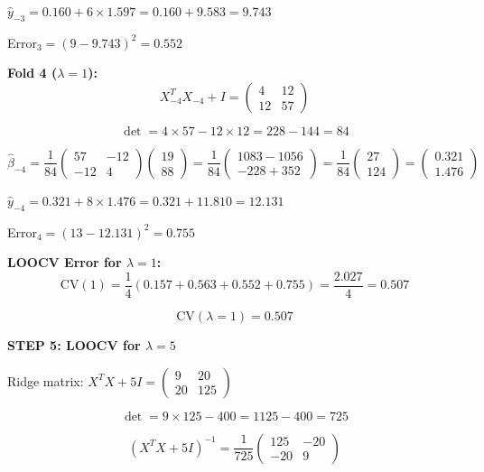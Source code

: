\documentclass[12pt]{article}
\begin{document}
\begin{solution}
$\hat{y}_{-3} = 0.160 + 6 \times 1.597 = 0.160 + 9.583 = 9.743$

Error$_3 = (9 - 9.743)^2 = 0.552$

\textbf{Fold 4 ($\lambda = 1$):}
\[X_{-4}^TX_{-4} + I = \begin{pmatrix} 4 & 12 \\ 12 & 57 \end{pmatrix}\]

\[\det = 4 \times 57 - 12 \times 12 = 228 - 144 = 84\]

\[\hat{\beta}_{-4} = \frac{1}{84}\begin{pmatrix} 57 & -12 \\ -12 & 4 \end{pmatrix}\begin{pmatrix} 19 \\ 88 \end{pmatrix} = \frac{1}{84}\begin{pmatrix} 1083 - 1056 \\ -228 + 352 \end{pmatrix} = \frac{1}{84}\begin{pmatrix} 27 \\ 124 \end{pmatrix} = \begin{pmatrix} 0.321 \\ 1.476 \end{pmatrix}\]

$\hat{y}_{-4} = 0.321 + 8 \times 1.476 = 0.321 + 11.810 = 12.131$

Error$_4 = (13 - 12.131)^2 = 0.755$

\textbf{LOOCV Error for $\lambda = 1$:}
\[\text{CV}(1) = \frac{1}{4}(0.157 + 0.563 + 0.552 + 0.755) = \frac{2.027}{4} = 0.507\]

\[\boxed{\text{CV}(\lambda = 1) = 0.507}\]

\textbf{STEP 5: LOOCV for $\lambda = 5$}

Ridge matrix: $X^TX + 5I = \begin{pmatrix} 9 & 20 \\ 20 & 125 \end{pmatrix}$

\[\det = 9 \times 125 - 400 = 1125 - 400 = 725\]

\[(X^TX + 5I)^{-1} = \frac{1}{725}\begin{pmatrix} 125 & -20 \\ -20 & 9 \end{pmatrix}\]


\end{solution}
\end{document}
